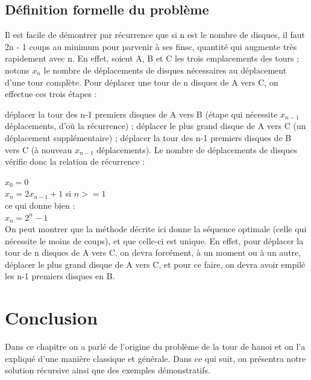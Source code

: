 \subsection{Définition formelle du problème}
Il est facile de démontrer par récurrence que si n est le nombre de disques, il faut 2n - 1 coups au minimum pour parvenir à ses finsc, quantité qui augmente très rapidement avec n. En effet, soient A, B et C les trois emplacements des tours ; notons $x_n$ le nombre de déplacements de disques nécessaires au déplacement d'une tour complète. Pour déplacer une tour de n disques de A vers C, on effectue ces trois étapes\cite{website1} :

déplacer la tour des n-1 premiers disques de A vers B (étape qui nécessite $x_{n-1}$ déplacements, d’où la récurrence) ;
déplacer le plus grand disque de A vers C (un déplacement supplémentaire) ;
déplacer la tour des n-1 premiers disques de B vers C (à nouveau $x_{n-1}$ déplacements).
Le nombre de déplacements de disques vérifie donc la relation de récurrence :

\hspace*{6.4cm}                        $x_0 = 0$ \\
\hspace*{7cm}                        $x_n = 2x_{n-1}+1$ si $n >= 1$ \\
ce qui donne bien : \\
\hspace*{7cm}                        $x_n = 2^n - 1$ \\

On peut montrer que la méthode décrite ici donne la séquence optimale (celle qui nécessite le moins de coups), et que celle-ci est unique. En effet, pour déplacer la tour de n disques de A vers C, on devra forcément, à un moment ou à un autre, déplacer le plus grand disque de A vers C, et pour ce faire, on devra avoir empilé les n-1 premiers disques en B.

\section{Conclusion}
Dans ce chapitre on a parlé de l'origine du problème de la tour de hanoi et on l'a expliqué  d'une manière classique et générale. Dans ce qui suit, on présentra notre solution récursive ainsi que des exemples démonstratifs. 
